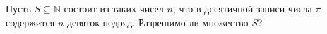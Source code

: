 Пусть $S \subseteq \mathbb{N}$ состоит из таких чисел $n$, что в десятичной записи числа $\pi$ содержится $n$ девяток
подряд. Разрешимо ли множество $S$?
